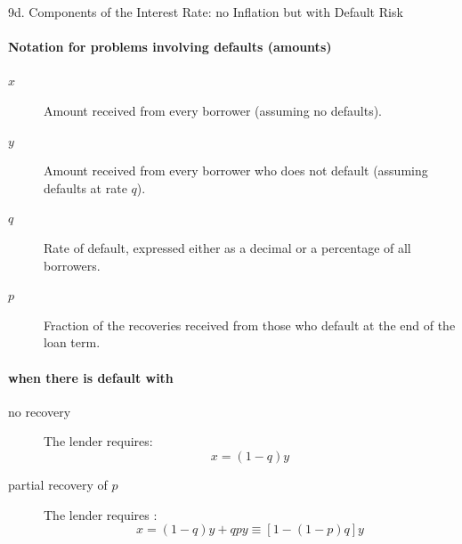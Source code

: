 \begin{CHPT_SUMM_AUTO}[label = {L.-9d}]{9d. Components of the Interest Rate: no Inflation but with Default Risk}
\paragraph{Notation for problems involving defaults (amounts)}
\begin{description}
	\item[$x$]	Amount received from every borrower (assuming no defaults).
	\item[$y$]	Amount received from every borrower who does not default (assuming defaults at rate $q$).
	\item[$q$]	Rate of default, expressed either as a decimal or a percentage of all borrowers.
	\item[$p$]	Fraction of the recoveries received from those who default at the end of the loan term.
\end{description}

\paragraph{when there is default with}
\begin{description}
	\item[no recovery]	The lender requires:
		\[
			x = (1 - q)y
		\]
	\item[partial recovery of $p$]	The lender requires :
		\[
			x = (1 - q)y + qpy \equiv [1 - (1 - p)q]y
		\]
\end{description}

\tcbline


\end{CHPT_SUMM_AUTO}
